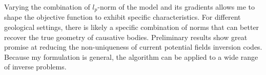 Varying the combination of $l_p$-norm of the model and its gradients allows me to shape the objective function to exhibit specific characteristics. For different geological settings, there is likely a specific combination of norms that can better recover the true geometry of causative bodies. 
Preliminary results show great promise at reducing the non-uniqueness of current potential fields inversion codes.
Because my formulation is general, the algorithm can be applied to a wide range of inverse problems. 


\endinput

